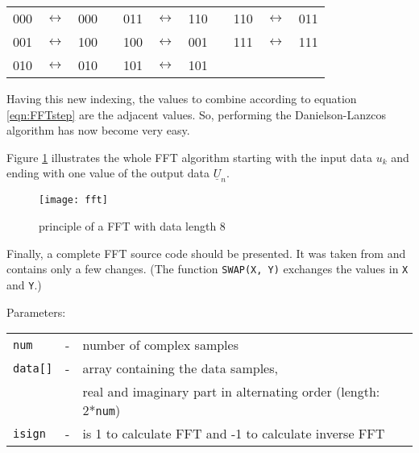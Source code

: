\begin{tabular}{ccccccccccc}
000 & $\leftrightarrow$ & 000  & \qquad\qquad &  011 & $\leftrightarrow$ & 110  & \qquad\qquad &  110 & $\leftrightarrow$ & 011 \\
001 & $\leftrightarrow$ & 100  & \qquad\qquad &  100 & $\leftrightarrow$ & 001  & \qquad\qquad &  111 & $\leftrightarrow$ & 111 \\
010 & $\leftrightarrow$ & 010  & \qquad\qquad &  101 & $\leftrightarrow$ & 101 \\
\end{tabular}

Having this new indexing, the values to combine according to
equation \ref{eqn:FFTstep} are the adjacent values. So, performing
the Danielson-Lanzcos algorithm has now become very easy.

\addvspace{12pt}

Figure \ref{fig:fft} illustrates the whole FFT algorithm starting with the
input data $u_k$ and ending with one value of the output data
$\underline{U}_n$.

\begin{figure}[htb]
\begin{center}
\texttt{[image: fft]}
\end{center}
\caption{principle of a FFT with data length 8}
\label{fig:fft}
\end{figure}
\FloatBarrier

Finally, a complete FFT source code should be presented. It was taken
from \cite{Press} and contains only a
few changes. (The function \texttt{SWAP(X, Y)} exchanges the values in
\texttt{X} and \texttt{Y}.)

\addvspace{12pt}

Parameters:\\
\begin{tabular}{lcl}
\texttt{num}    & - & number of complex samples\\
\texttt{data[]} & - & array containing the data samples,\\
                &   & real and imaginary part in alternating order (length: 2*\texttt{num})\\
\texttt{isign}  & - & is 1 to calculate FFT and -1 to calculate inverse FFT
\end{tabular}

\addvspace{12pt}

